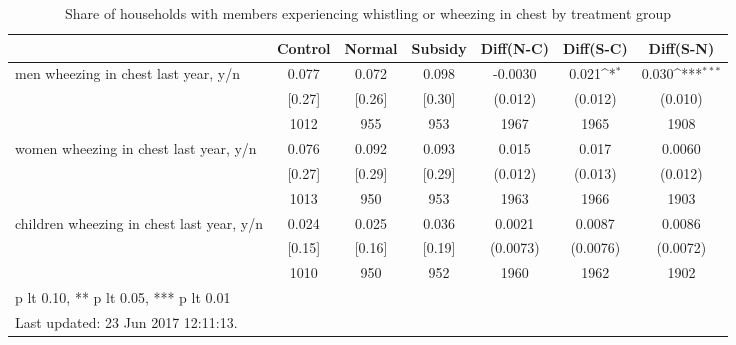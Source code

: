 \begin{table}[htbp]\centering
\def\sym#1{\ifmmode^{#1}\else\(^{#1}\)\fi}
\caption{Share of households with members experiencing whistling or wheezing in chest by treatment group \label{tab:"balance"}}
\begin{tabular*}{1\hsize}{@{\hskip\tabcolsep\extracolsep\fill}l*{1}{cccccc}}
\toprule
                                &  Control&   Normal&  Subsidy&Diff(N-C)         &Diff(S-C)         &Diff(S-N)         \\
\midrule
men wheezing in chest last year, y/n&    0.077&    0.072&    0.098&  -0.0030         &    0.021\sym{*}  &    0.030\sym{***}\\
                                &   [0.27]&   [0.26]&   [0.30]&  (0.012)         &  (0.012)         &  (0.010)         \\
                                &     1012&      955&      953&     1967         &     1965         &     1908         \\
women wheezing in chest last year, y/n&    0.076&    0.092&    0.093&    0.015         &    0.017         &   0.0060         \\
                                &   [0.27]&   [0.29]&   [0.29]&  (0.012)         &  (0.013)         &  (0.012)         \\
                                &     1013&      950&      953&     1963         &     1966         &     1903         \\
children wheezing in chest last year, y/n&    0.024&    0.025&    0.036&   0.0021         &   0.0087         &   0.0086         \\
                                &   [0.15]&   [0.16]&   [0.19]& (0.0073)         & (0.0076)         & (0.0072)         \\
                                &     1010&      950&      952&     1960         &     1962         &     1902         \\
\bottomrule
\multicolumn{7}{l}{\footnotesize * p lt 0.10, ** p lt 0.05, *** p lt 0.01}\\
\multicolumn{7}{l}{\footnotesize Last updated: 23 Jun 2017 12:11:13.}\\
\end{tabular*}
\end{table}
